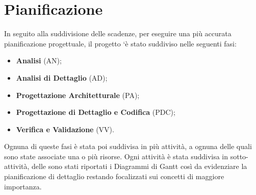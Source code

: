 \section{Pianificazione}
	In seguito alla suddivisione delle scadenze, per eseguire una più accurata pianificazione progettuale, il progetto `è stato suddiviso nelle seguenti fasi: \\
	\begin{itemize}
		\item \textbf{Analisi} (AN); \\
		\item \textbf{Analisi di Dettaglio} (AD); \\
		\item \textbf{Progettazione Architetturale} (PA); \\
		\item \textbf{Progettazione di Dettaglio e Codifica} (PDC); \\
		\item \textbf{Verifica e Validazione} (VV). \\
	\end{itemize}
	Ognuna di queste fasi è stata poi suddivisa in più attività, a ognuna delle quali sono state associate una o più risorse. Ogni attività è stata suddivisa in sotto-attività, delle sono stati riportati i 			Diagrammi di Gantt così da evidenziare la pianificazione di dettaglio restando focalizzati sui 				concetti di maggiore importanza.
